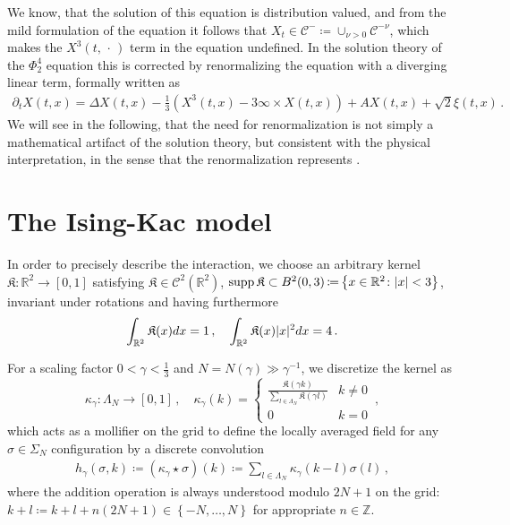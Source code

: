 \documentclass{report}
\newcommand{\ZZ}{\mathbb{Z}}
\newcommand{\RR}{\mathbb{R}}
\DeclarePairedDelimiter\abs{\lvert}{\rvert} %
\newcommand{\Placeholder}{\,\mathrel{\cdot}\,}
\newcommand{\Convolve}[3][]{#2 \star_{#1} #3}
\DeclareMathOperator{\DefiningEquality}{\coloneqq}
\DeclareMathOperator{\Union}{\cup}
\DeclareMathOperator{\Support}{supp}
\theoremstyle{remark}
\theoremstyle{definition}
\begin{document}
We know, that the solution of this equation is distribution valued, and from the mild formulation of the equation it follows that $X_t \in \mathcal{C}^- \DefiningEquality \Union_{\nu > 0} \mathcal{C}^{-\nu}$, which makes the $X^3(t, \Placeholder)$ term in the equation undefined. In the solution theory of the $\Phi^4_2$ equation this is corrected by renormalizing the equation with a diverging linear term, formally written as 
\begin{align}
  \partial_t X(t, x) = \Delta X(t, x) - \frac{1}{3}\left(X^3(t, x) - 3 \infty \times X(t, x)\right) + A X(t, x) + \sqrt{2}\xi(t, x)\,.
\end{align}
We will see in the following, that the need for renormalization is not simply a mathematical artifact of the solution theory, but consistent with the physical interpretation, in the sense that the renormalization represents  \cite{mourrat2015convergencetwodimensionaldynamicisingkac}.

\section{The Ising-Kac model}
In order to precisely describe the interaction, we choose an arbitrary kernel $\mathfrak{K}: \RR^2 \to [0, 1]$ satisfying $\mathfrak{K} \in \mathcal{C}^2(\RR^2)$, $\Support{\mathfrak{K}} \subset B^2(0, 3) \DefiningEquality \left\{x \in \RR^2 \colon \abs{x} < 3\right\}$, invariant under rotations and having furthermore $$\int_{\RR^2} \mathfrak{K}(x) dx = 1\,,\quad \int_{\RR^2} \mathfrak{K}(x) \abs{x}^2 dx = 4\,.$$


For a scaling factor $0 < \gamma < \frac{1}{3}$ and $N = N(\gamma) \gg \gamma^{-1}$, we discretize the kernel as 
$$\kappa_\gamma: \Lambda_N \to [0, 1]\,,\quad\kappa_\gamma(k) = \begin{cases}
  \frac{\mathfrak{K}(\gamma k)}{\sum_{l \in \Lambda_N} \mathfrak{K}(\gamma l)}&k \neq 0\\
  0 & k = 0
\end{cases}\,,$$
which acts as a mollifier on the grid to define the locally averaged field for any $\sigma \in \Sigma_N$ configuration by a discrete convolution
\begin{align}
  h_\gamma(\sigma, k) \DefiningEquality (\Convolve{\kappa_\gamma}{\sigma})(k) \DefiningEquality  \sum_{l\in \Lambda_N} \kappa_\gamma(k-l) \sigma(l)\,,
\end{align}
where the addition operation is always understood modulo $2N + 1$ on the grid: $k + l \DefiningEquality k + l + n(2N + 1) \in \left\{-N, \ldots, N\right\}$ for appropriate $n \in \ZZ$. 
\end{document}
